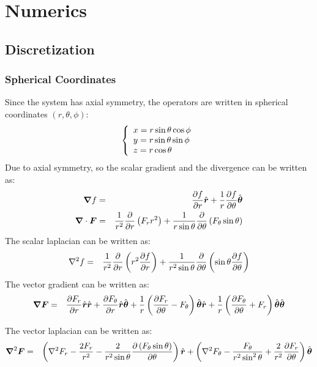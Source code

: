 \section{Numerics}
\subsection{Discretization}
\subsubsection{Spherical Coordinates}
Since the system has axial symmetry, the operators are written in 
spherical coordinates $(r,\theta,\phi)$:
\begin{eqnarray}
\brc{l}{
x = r \sin \theta \cos \phi \\
y = r \sin \theta \sin \phi \\
z = r \cos \theta} 
\end{eqnarray}
Due to axial symmetry, 
so the scalar gradient and the divergence can be written as:
\begin{eqnarray}
\bnabla f &=& \deriv{f}{r}\brhat + \frac{1}{r}\deriv{f}{\theta}\bthetahat \\
\bnabla \cdot \bF &=& \frac{1}{r^2}\deriv{}{r}\pars{F_r r^2 } + 
                     \frac{1}{r \sin\theta}\deriv{}{\theta}\pars{F_\theta \sin\theta}
\end{eqnarray}
The scalar laplacian can be written as:
\begin{eqnarray}
\Laplacian f &=& \frac{1}{r^2}\deriv{}{r}\pars{r^2 \deriv{f}{r}} + 
                     \frac{1}{r^2 \sin\theta}\deriv{}{\theta}\pars{\sin\theta \deriv{f}{\theta}}
\end{eqnarray}
The vector gradient can be written as:
\begin{eqnarray}
\bnabla \bF &=& \deriv{F_r}{r} \brhat \brhat + \deriv{F_\theta}{r} \brhat \bthetahat + 
\frac{1}{r}\pars{\deriv{F_r}{\theta} - F_\theta} \bthetahat \brhat + 
\frac{1}{r}\pars{\deriv{F_\theta}{\theta} + F_r} \bthetahat \bthetahat
\end{eqnarray}

The vector laplacian can be written as:
\begin{eqnarray}
\bLaplacian \bF &=& 
\left(\Laplacian F_r - \frac{2F_r}{r^2} - 
\frac{2}{r^2 \sin\theta} \deriv{\left(F_\theta \sin\theta \right)}{\theta}\right)\brhat
+ \left(\Laplacian F_\theta - \frac{F_\theta}{r^2 \sin^2\theta} + 
\frac{2}{r^2}\deriv{F_r}{\theta}\right) \bthetahat
\end{eqnarray}

